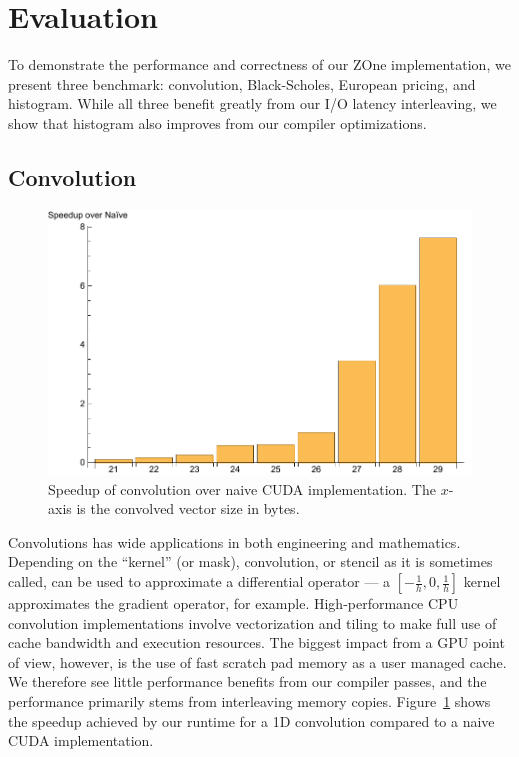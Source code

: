 \section{Evaluation}

To demonstrate the performance and correctness of our ZOne implementation, we
present three benchmark: convolution, Black-Scholes, European pricing, and histogram.
While all three benefit greatly from our I/O latency interleaving, we show
  that histogram also improves from our compiler optimizations.


\subsection{Convolution}

\begin{figure}
\centering
\includegraphics[scale=0.5]{data/stencil.pdf}
\caption{Speedup of convolution over naive CUDA implementation.
  The $x$-axis is the convolved vector size in bytes.}
\label{fig:stencil}
\centering
\end{figure}

Convolutions has wide applications in both engineering and mathematics.
Depending on the ``kernel'' (or mask), convolution, or stencil as it is sometimes called,   can be used to approximate a differential operator ---
 a $[-\frac{1}{h}, 0, \frac{1}{h}]$ kernel approximates the gradient operator, for example.
High-performance CPU convolution implementations
involve vectorization and tiling to make full use of cache bandwidth and
execution resources.
The biggest impact from a GPU point of view, however, is the use of fast
  scratch pad memory as a user managed cache.
We therefore see little performance benefits from our compiler passes, and the
  performance primarily stems from interleaving memory copies.
Figure~\ref{fig:stencil} shows the speedup achieved by our runtime for a 1D
  convolution compared to a naive CUDA implementation.



